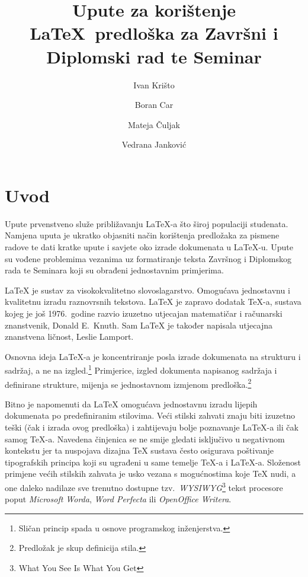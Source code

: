 \documentclass[zavrsni, lmodern, utf8]{fer}
\begin{document}
\title{Upute za korištenje \LaTeX\ predloška za Završni i Diplomski rad te Seminar}
\author{Ivan Krišto \and Boran Car \and Mateja Čuljak \and Vedrana Janković}

\maketitle

\zahvala{}

\tableofcontents

\chapter{Uvod}
Upute prvenstveno služe približavanju \LaTeX-a što široj populaciji studenata.
Namjena uputa je ukratko objasniti način korištenja predložaka za pismene radove
te dati kratke upute i savjete oko izrade dokumenata u \LaTeX-u. Upute su vođene
problemima vezanima uz formatiranje teksta Završnog i Diplomskog rada te Seminara
koji su obrađeni jednostavnim primjerima.

\LaTeX{} je sustav za visokokvalitetno slovoslagarstvo. Omogućava jednostavnu i
kvalitetnu izradu raznovrsnih tekstova. \LaTeX{} je zapravo dodatak \TeX-a, sustava
kojeg je još 1976.\ godine razvio izuzetno utjecajan matematičar i računarski
znanstvenik, Donald E.~Knuth. Sam \LaTeX{} je također napisala utjecajna
znanstvena ličnost, Leslie Lamport.

Osnovna ideja \LaTeX-a je koncentriranje posla izrade dokumenata na strukturu i
sadržaj, a ne na izgled.\footnote{Sličan princip spada u osnove programskog inženjerstva.}
Primjerice, izgled dokumenta napisanog sadržaja i definirane strukture, 
mijenja se jednostavnom izmjenom predloška.\footnote{Predložak je skup
definicija stila.}

Bitno je napomenuti da \LaTeX{} omogućava jednostavnu izradu lijepih dokumenata
po predefiniranim stilovima. Veći stilski zahvati znaju biti izuzetno teški (čak i
izrada ovog predloška) i zahtijevaju bolje poznavanje \LaTeX-a ili čak samog
\TeX-a. Navedena činjenica se ne smije gledati isključivo u negativnom kontekstu jer
ta nuspojava dizajna \TeX{} sustava često osigurava poštivanje tipografskih principa
koji su ugrađeni u same temelje \TeX-a i \LaTeX-a. Složenost primjene većih stilskih
zahvata je usko vezana s mogućnostima koje \TeX{} nudi, a one daleko nadilaze sve
trenutno dostupne tzv.\ \emph{WYSIWYG}\footnote{What You See Is What You Get} tekst
procesore poput \emph{Microsoft Worda}, \emph{Word Perfecta} ili \emph{OpenOffice Writera}.
\end{document}
